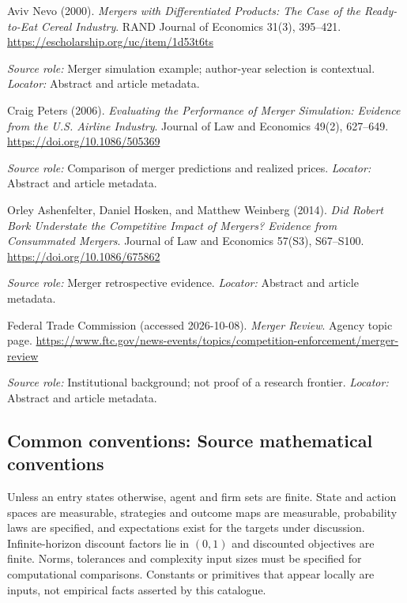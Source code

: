\documentclass[11pt,a4paper]{article}
\begin{document}
\begin{enumerate}[label={[S\arabic*]},leftmargin=*]

\item Aviv Nevo (2000). \emph{Mergers with Differentiated Products: The Case of the Ready-to-Eat Cereal Industry}. RAND Journal of Economics 31(3), 395--421. \url{https://escholarship.org/uc/item/1d53t6ts}\par \textit{Source role:} Merger simulation example; author-year selection is contextual. \textit{Locator:} Abstract and article metadata.

\item Craig Peters (2006). \emph{Evaluating the Performance of Merger Simulation: Evidence from the U.S. Airline Industry}. Journal of Law and Economics 49(2), 627--649. \url{https://doi.org/10.1086/505369}\par \textit{Source role:} Comparison of merger predictions and realized prices. \textit{Locator:} Abstract and article metadata.

\item Orley Ashenfelter, Daniel Hosken, and Matthew Weinberg (2014). \emph{Did Robert Bork Understate the Competitive Impact of Mergers? Evidence from Consummated Mergers}. Journal of Law and Economics 57(S3), S67--S100. \url{https://doi.org/10.1086/675862}\par \textit{Source role:} Merger retrospective evidence. \textit{Locator:} Abstract and article metadata.

\item Federal Trade Commission (accessed 2026-10-08). \emph{Merger Review}. Agency topic page. \url{https://www.ftc.gov/news-events/topics/competition-enforcement/merger-review}\par \textit{Source role:} Institutional background; not proof of a research frontier. \textit{Locator:} Abstract and article metadata.

\end{enumerate}

\subsection*{Common conventions: Source mathematical conventions}

Unless an entry states otherwise, agent and firm sets are finite. State and action spaces are measurable, strategies and outcome maps are measurable, probability laws are specified, and expectations exist for the targets under discussion. Infinite-horizon discount factors lie in $(0,1)$ and discounted objectives are finite. Norms, tolerances and complexity input sizes must be specified for computational comparisons. Constants or primitives that appear locally are inputs, not empirical facts asserted by this catalogue.
\end{document}

